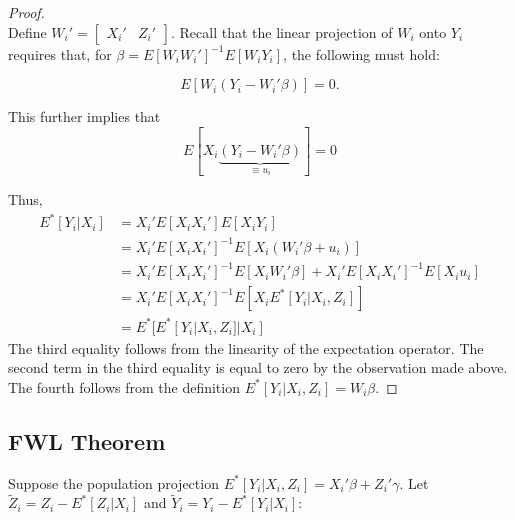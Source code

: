 \documentclass[11pt]{article}
\begin{document}
\begin{proof}\mbox{}\\
	Define $W_i' = \begin{bmatrix}X_i' & Z_i'\end{bmatrix}$. Recall that the linear projection of $W_i$ onto $Y_i$ requires that, for $\beta = E[W_i W_i']^{-1}E[W_i Y_i]$, the following must hold:

	$$E[W_i(Y_i - W_i'\beta)] = 0.$$

	This further implies that $$E[X_i\underbrace{(Y_i - W_i'\beta)}_{\equiv u_i}] = 0$$

	Thus,
	\begin{align*}
		E^*[Y_i|X_i] & = X_i'E[X_iX_i']E[X_iY_i] \\
		& = X_i'E[X_iX_i']^{-1}E[X_i(W_i'\beta + u_i)] \\
		& = X_i'E[X_iX_i']^{-1}E[X_i W_i'\beta] + X_i'E[X_iX_i']^{-1}E[X_i u_i] \\
		& = X_i'E[X_iX_i']^{-1}E[X_i E^*[Y_i|X_i,Z_i]] \\
		& = E^*[E^*[Y_i|X_i,Z_i]|X_i]
	\end{align*}
	The third equality follows from the linearity of the expectation operator. The second term in the third equality is equal to zero by the observation made above. The fourth follows from the definition $E^*[Y_i|X_i,Z_i] = W_i\beta$.
	\end{proof}

\subsection*{FWL Theorem}
Suppose the population projection $E^*[Y_i|X_i,Z_i] = X_i'\beta + Z_i'\gamma$. Let $\tilde Z_i = Z_i - E^*[Z_i|X_i]$ and $\tilde Y_i = Y_i - E^*[Y_i|X_i]$:
\end{document}
